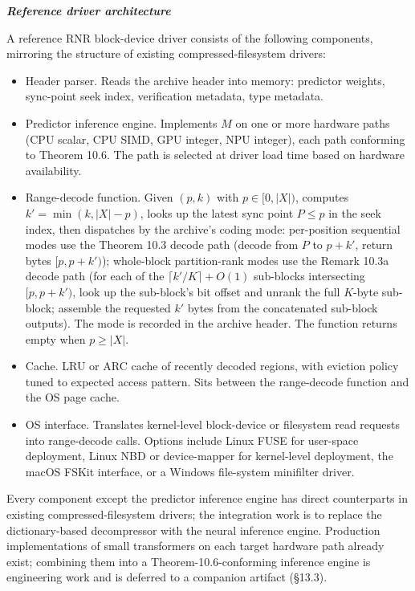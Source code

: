 \documentclass[
]{article}
\begin{document}
\emph{\textbf{Reference driver architecture}}

A reference RNR block-device driver consists of the following
components, mirroring the structure of existing compressed-filesystem
drivers:

\begin{itemize}
\item
  Header parser. Reads the archive header into memory: predictor
  weights, sync-point seek index, verification metadata, type
  metadata.
\item
  Predictor inference engine. Implements $M$ on one or more hardware
  paths (CPU scalar, CPU SIMD, GPU integer, NPU integer), each path
  conforming to Theorem 10.6. The path is selected at driver load
  time based on hardware availability.
\item
  Range-decode function. Given $(p, k)$ with $p \in [0, |X|)$,
  computes $k' = \min(k, |X| - p)$, looks up the latest sync point
  $P \leq p$ in the seek index, then dispatches by the archive's
  coding mode: per-position sequential modes use the Theorem 10.3
  decode path (decode from $P$ to $p + k'$, return bytes $[p, p + k')$);
  whole-block partition-rank modes use the Remark 10.3a decode
  path (for each of the $\lceil k'/K \rceil + O(1)$ sub-blocks
  intersecting $[p, p + k')$, look up the sub-block's bit offset
  and unrank the full $K$-byte sub-block; assemble the requested
  $k'$ bytes from the concatenated sub-block outputs). The mode is
  recorded in the archive header. The function returns empty when
  $p \geq |X|$.
\item
  Cache. LRU or ARC cache of recently decoded regions, with eviction
  policy tuned to expected access pattern. Sits between the
  range-decode function and the OS page cache.
\item
  OS interface. Translates kernel-level block-device or filesystem
  read requests into range-decode calls. Options include Linux FUSE
  for user-space deployment, Linux NBD or device-mapper for
  kernel-level deployment, the macOS FSKit interface, or a Windows
  file-system minifilter driver.
\end{itemize}

Every component except the predictor inference engine has direct
counterparts in existing compressed-filesystem drivers; the integration
work is to replace the dictionary-based decompressor with the neural
inference engine. Production implementations of small transformers on
each target hardware path already exist; combining them into a
Theorem-10.6-conforming inference engine is engineering work and is
deferred to a companion artifact (§13.3).
\end{document}

